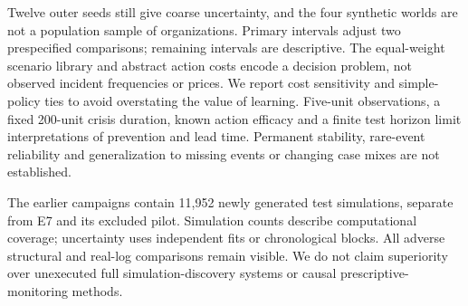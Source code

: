 \documentclass[runningheads]{llncs}
\begin{document}
Twelve outer seeds still give coarse uncertainty, and the four synthetic worlds are not a population sample of organizations. Primary intervals adjust two prespecified comparisons; remaining intervals are descriptive. The equal-weight scenario library and abstract action costs encode a decision problem, not observed incident frequencies or prices. We report cost sensitivity and simple-policy ties to avoid overstating the value of learning. Five-unit observations, a fixed 200-unit crisis duration, known action efficacy and a finite test horizon limit interpretations of prevention and lead time. Permanent stability, rare-event reliability and generalization to missing events or changing case mixes are not established.

The earlier campaigns contain 11,952 newly generated test simulations, separate from E7 and its excluded pilot. Simulation counts describe computational coverage; uncertainty uses independent fits or chronological blocks. All adverse structural and real-log comparisons remain visible. We do not claim superiority over unexecuted full simulation-discovery systems or causal prescriptive-monitoring methods.



\label{maintextend}


\end{document}
